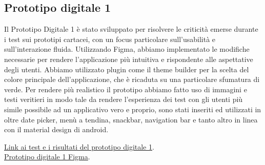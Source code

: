 \subsection{Prototipo digitale 1}
Il Prototipo Digitale 1 è stato sviluppato per risolvere le criticità emerse durante i test sui prototipi cartacei, con un focus particolare sull’usabilità e sull'interazione fluida. Utilizzando Figma, abbiamo implementato le modifiche necessarie per rendere l’applicazione più intuitiva e rispondente alle aspettative degli utenti.
Abbiamo utilizzato plugin come il theme builder per la scelta del colore principale dell’applicazione, che è ricaduta su una particolare sfumatura di verde.
Per rendere più realistico il prototipo abbiamo fatto uso di immagini e testi veritieri in modo tale da rendere l’esperienza dei test con gli utenti più simile possibile ad un applicativo vero e proprio, sono stati inseriti  ed utilizzati in oltre date picker, menù a tendina, snackbar, navigation bar e tanto altro in linea con il material design di android.

\href{https://docs.google.com/document/d/191id0R8jCigYp_66I8CCrCStzwEtUhKlE9EzxcQVM0I/edit?tab=t.0}{Link ai test e i risultati del prototipo digitale 1}.\\
\href{https://www.figma.com/files/project/321365683}{Prototipo digitale 1 Figma}.

